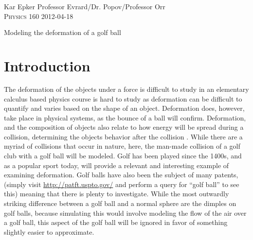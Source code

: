 \documentclass{article}
\newcommand{\shortname}{Kar Epker}
\newcommand{\header}[4]{
\vspace{-2ex}
\begin{flushleft}
{\large \shortname} \hfill {#1} \\
\textsc{#2} \hfill{#3} \\
\vspace{-1ex}
\hrulefill
\end{flushleft}
\begin{center}

{\LARGE #4}\\
\end{center}
\vspace{3ex}
}
\begin{document}
\header{Professor Evrard/Dr. Popov/Professor Orr}{Physics 160}{2012-04-18}{Modeling the deformation of a golf ball}

\begin{abstract}

The deformation of objects as a result of force is one of its important ef\mbox{f}ects, but because of its chaotic nature, cannot be described easily with a set of equations. While many deformations occur in the world, a particular case, that of a golf ball being hit by a club, was explored. In order to explore this motion computationally, a ball-spring model of the golf ball was made. The ball-spring model uses a clever substitution in the definition of Young's modulus to calculate a ``spring constant'' for two points. Geodesic spheres were used to place individual ``balls'' (henceforth referred to as ``particles'') evenly on the surface of nested geodesic spheres. The particles were then connected to each other using a set of springs, whose constant was found using the Young's modulus for butadiene rubber, a common material for the inside of golf balls. Qualitatively, the end simulation appeared to agree with existing videos of a golf ball being hit in slow motion. Quantatively, the velocity of the center of mass of the ball corresponded with measured values, as did the time scale for the wave which moves through the ball, but the spin was found to greatly exceed the measured values for spin of golf balls. It was concluded that the ball-spring model of solids is appropriate for simulating a golf ball. Further work may seek to improve the accuracy of the model.
\end{abstract}

\section{Introduction}

The deformation of the objects under a force is dif\mbox{f}icult to study in an elementary calculus based physics course is hard to study as deformation can be difficult to quantify and varies based on the shape of an object. Deformation does, however, take place in physical systems, as the bounce of a ball will confirm. Deformation, and the composition of objects also relate to how energy will be spread during a collision, determining the objects behavior after the collision \cite{whybounce}. While there are a myriad of collisions that occur in nature, here, the man-made collision of a golf club with a golf ball will be modeled. Golf has been played since the 1400s, \cite{history} and as a popular sport today, will provide a relevant and interesting example of examining deformation. Golf balls have also been the subject of many patents, (simply visit \url{http://patft.uspto.gov/} and perform a query for ``golf ball'' to see this) meaning that there is plenty to investigate. While the most outwardly striking di\mbox{f}ference between a golf ball and a normal sphere are the dimples on golf balls, because simulating this would involve modeling the flow of the air over a golf ball, this aspect of the golf ball will be ignored in favor of something slightly easier to approximate.
\end{document}

